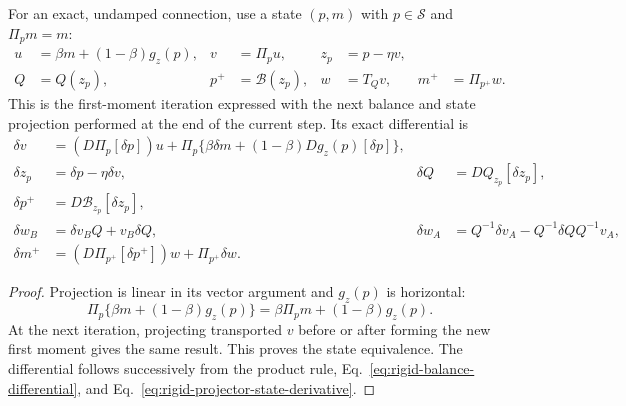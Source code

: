 \begin{theorem}
\label{thm:rigid-actual-state-jacobian}
For an exact, undamped connection, use a state $(p,m)$ with
$p\in\mathcal S$ and $\Pi_pm=m$:
\begin{align}
u&=\beta m+(1-\beta)g_z(p),&
v&=\Pi_pu,&z_p&=p-\eta v,\\
Q&=Q(z_p),&p^+&=\mathcal B(z_p),&
w&=T_Qv,&m^+&=\Pi_{p^+}w .
\label{eq:rigid-canonical-state}
\end{align}
This is the first-moment iteration expressed with the next balance and
state projection performed at the end of the current step.
Its exact differential is
\begin{align}
\delta v
&=(D\Pi_p[\delta p])u+
\Pi_p\{\beta\delta m+(1-\beta)Dg_z(p)[\delta p]\},\\
\delta z_p&=\delta p-\eta\delta v,&
\delta Q&=DQ_{z_p}[\delta z_p],\\
\delta p^+&=D\mathcal B_{z_p}[\delta z_p],\\
\delta w_B&=\delta v_BQ+v_B\delta Q,&
\delta w_A&=Q^{-1}\delta v_A-Q^{-1}\delta Q Q^{-1}v_A,\\
\delta m^+
&=(D\Pi_{p^+}[\delta p^+])w+\Pi_{p^+}\delta w .
\label{eq:rigid-actual-state-jacobian}
\end{align}
\end{theorem}
\begin{proof}
Projection is linear in its vector argument and $g_z(p)$ is horizontal:
\begin{equation}
\Pi_p\{\beta m+(1-\beta)g_z(p)\}
=\beta\Pi_pm+(1-\beta)g_z(p).
\end{equation}
At the next iteration, projecting transported $v$ before or after
forming the new first moment gives the same result. This proves the
state equivalence. The differential follows successively from the
product rule, Eq.~\eqref{eq:rigid-balance-differential}, and
Eq.~\eqref{eq:rigid-projector-state-derivative}.
\end{proof}

